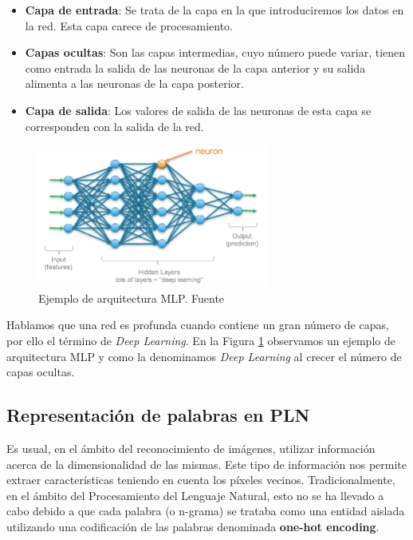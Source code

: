\begin{itemize}
	\item \textbf{Capa de entrada}: Se trata de la capa en la que introduciremos los datos en la red. Esta capa carece de procesamiento.
	\item \textbf{Capas ocultas}: Son las capas intermedias, cuyo número puede variar, tienen como entrada la salida de las neuronas de la capa anterior y su salida alimenta a las neuronas de la capa posterior.  
	\item \textbf{Capa de salida}: Los valores de salida de las neuronas de esta capa se corresponden con la salida de la red.
\end{itemize}
 
\begin{figure}[!ht]
	\centering
	\includegraphics[width=0.68\textwidth]{images/arte/mlp}
	\caption{Ejemplo de arquitectura MLP. Fuente \cite{mlp}}
	\label{fig:mlp}
\end{figure}



Hablamos que una red es profunda cuando contiene un gran número de capas, por ello el término de \textit{Deep Learning}. En la Figura \ref{fig:mlp} observamos un ejemplo de arquitectura MLP y como la denominamos \textit{Deep Learning} al crecer el número de capas ocultas.


\subsection{Representación de palabras en PLN}%

Es usual, en el ámbito del reconocimiento de imágenes, utilizar información acerca de la dimensionalidad de las mismas. Este tipo de información nos permite extraer características  teniendo en cuenta los píxeles vecinos. Tradicionalmente, en el ámbito del Procesamiento del Lenguaje Natural, esto no se ha llevado a cabo debido a que cada palabra (o n-grama) se trataba como una entidad aislada utilizando una codificación de las palabras denominada \textbf{one-hot encoding}. 

